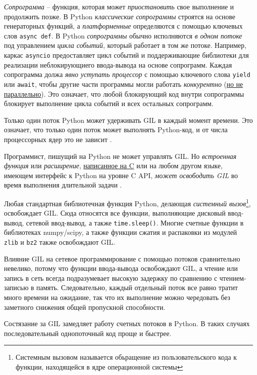 \documentclass[%
	11pt,
	a4paper,
	utf8,
		]{article}
\begin{document}
\emph{Сопрограмма} -- функция, которая может \emph{приостановить} свое выполнение и продолжить позже. В Python \emph{классические сопрограммы} строятся на основе генераторных функций, а \emph{платформенные} определяются с помощью ключевых слов \verb|async def|. В Python \emph{сопрограммы} обычно исполняются \emph{в одном потоке} под управлением \emph{цикла событий}, который работает в том же потоке. Например, каркас \verb|asyncio| предоставляет цикл событий и поддерживающие библиотеки для реализации неблокирующиего ввода-вывода на основе сопрограмм. Каждая сопрограмма должа \emph{явно уступать процессор} с помощью ключевого слова \verb*|yield| или \verb|await|, чтобы другие части программы могли работать \emph{конкурентно} (\underline{но не параллельно}). Это означает, что любой блокирующий код внутри сопрограммы блокирует выполнение цикла событий и всех остальных сопрограмм.

Только один поток Python может удерживать GIL в каждый момент времени. Это означает, что только один поток может выполнять Python-код, и от числа процессорных ядер это не зависит \cite[]{ramalho:python-2022}.

Программист, пишущий на Python не может управлять GIL. Но \emph{встроенная функция} или \emph{расширение}, \underline{написанное на C} или на любом другом языке, имеющем интерфейс к Python на уровне C API, \emph{может освободить GIL} во время выполнения длительной задачи \cite[]{ramalho:python-2022}.

Любая стандартная библиотечная функция Python, делающая \emph{системный вызов}\footnote{Системным вызовом называется обьращение из пользовательского кода к функции, находящейся в ядре операционной системы}, освобождает GIL. Сюда относятся все функции, выполняющие дисковый ввод-вывод, сетевой ввод-вывод, а также \verb*|time.sleep()|. Многие счетные функции в библиотеках numpy/scipy, а также функции сжатия и распаковки из модулей \verb|zlib| и \verb*|bz2| также освобождают GIL.

Влияние GIL на сетевое программирование с помощью потоков сравнительно невелико, потому что функции ввода-вывода освобождают GIL, а чтение или запись в сеть всегда подразумевает высокую задержку по сравнению с чтением-записью в память. Следовательно, каждый отдельный поток все равно тратит много времени на ожидание, так что их выполнение можно чередовать без заметного снижения общей пропускной способности.

Состязание за GIL замедляет работу счетных потоков в Python. В таких случаях последовательный однопоточный код проще и быстрее.
\end{document}

